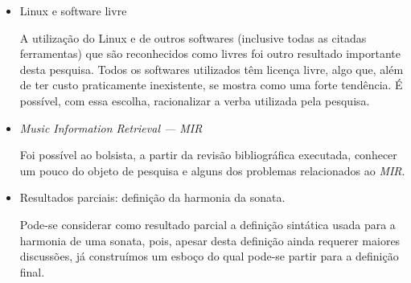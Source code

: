\documentclass[11pt]{article}
\newcommand{\eng}[1]{\textit{#1}}
\begin{document}
\begin{itemize}
  Este foi um dos mais importantes resultados desta pesquisa. As
  ferramentas nela utilizadas têm lugar em qualquer investigação
  científica, seja da área de Música ou não. A documentação das
  atividades através de \eng{logbook} e lista de e-mails tornou fácil,
  rápida e precisa toda busca por informação referente aos passos do
  trabalho. Exemplo disso é a precisão de data das atividades
  realizadas listadas na seção \ref{sec:atividades}. O uso do controle
  de versão permitiu perfeitamente o trabalho simultâneo e
  não-presencial em grupo. Essa ferramenta permite que se edite
  arquivos sem que se perca nenhuma informação, já que a cada edição
  ela registra apenas o conteúdo modificado, o usuário que modificou,
  nome do arquivo, data e hora, e envia a tais dados a um repositório
  central que é acessado por todos. Cada um baixa apenas o conteúdo
  modificado e atualiza seu repositório individual. Exemplo do uso
  desta ferramenta é o artigo escrito para a ANPPOM 2006 (c.f. seção
  \ref{sec:artigos}), que foi feito em co-autoria por todo o grupo de
  pesquisa. Os sistemas de tipografia musical e de texto também têm
  funcionalidades muito interessantes. Com o sistema \LaTeX, por
  exemplo, é possível escrever um texto sem a preocupação com a
  formatação final, que pode seguir padrão ABNT, Turabian, PIBIC ou
  qualquer outro. Isto é possível porque esta ferramenta trabalha com
  marcações e pacotes de estilos (como HTML e CSS).  Para mudança de
  estilo basta selecionar o pacote desejado. As funcionalidades destas
  ferramentas se mostraram tão sedutoras que levaram o bolsista a
  mudar completamente seu conceito de uso de computador.


\item Linux e software livre

  A utilização do Linux e de outros softwares (inclusive todas as
  citadas ferramentas) que são reconhecidos como livres foi outro
  resultado importante desta pesquisa. Todos os softwares utilizados
  têm licença livre, algo que, além de ter custo praticamente
  inexistente, se mostra como uma forte tendência. É possível, com
  essa escolha, racionalizar a verba utilizada pela pesquisa.

\item \eng{Music Information Retrieval --- MIR}

Foi possível ao bolsista, a partir da revisão bibliográfica executada,
conhecer um pouco do objeto de pesquisa e alguns dos problemas
relacionados ao \eng{MIR}.

\item Resultados parciais: definição da harmonia da sonata.

Pode-se considerar como resultado parcial a definição sintática usada
para a harmonia de uma sonata, pois, apesar desta definição ainda
requerer maiores discussões, já construímos um esboço do qual pode-se
partir para a definição final.

\end{itemize}
\end{document}
